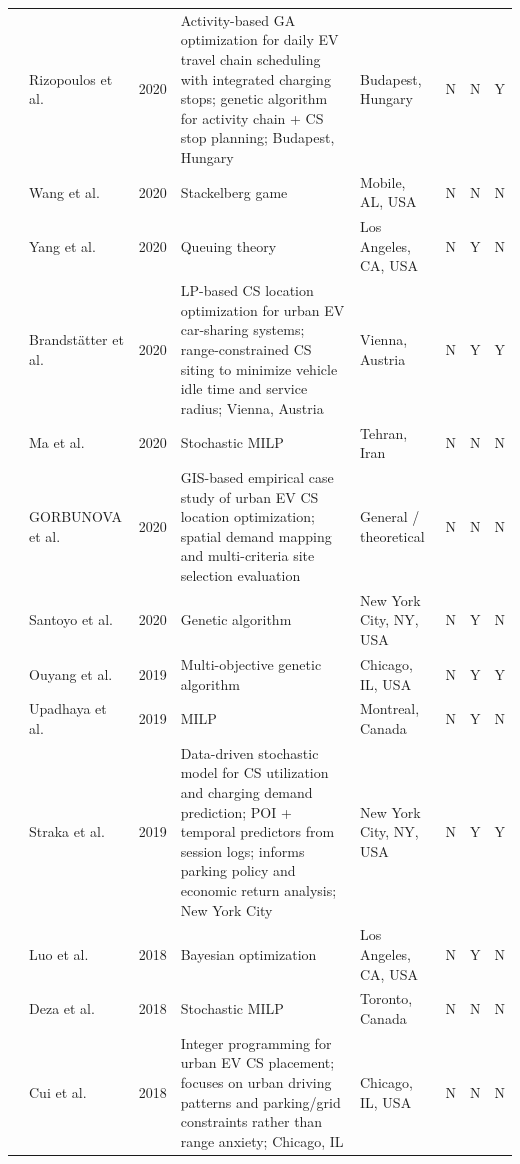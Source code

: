\documentclass[letterpaper, 12pt, oneside, doublespacing]{Thesis}
\begin{document}
\begin{longtable}{L{0.9cm} L{1.8cm} L{0.7cm} L{2.5cm} L{2.1cm} L{0.7cm} L{0.7cm} L{0.7cm}}
\cite{a_method_2020} & Rizopoulos et al. & 2020 & Activity-based GA optimization for daily EV travel chain scheduling with integrated charging stops; genetic algorithm for activity chain + CS stop planning; Budapest, Hungary & Budapest, Hungary & N & N & Y \\
\cite{double-layer_game_2020} & Wang et al. & 2020 & Stackelberg game & Mobile, AL, USA & N & N & N \\
\cite{dynamic_modeling_2020} & Yang et al. & 2020 & Queuing theory & Los Angeles, CA, USA & N & Y & N \\
\cite{location_of_2020} & Brandst\"atter et al. & 2020 & LP-based CS location optimization for urban EV car-sharing systems; range-constrained CS siting to minimize vehicle idle time and service radius; Vienna, Austria & Vienna, Austria & N & Y & Y \\
\cite{optimal_fast_2020} & Ma et al. & 2020 & Stochastic MILP & Tehran, Iran & N & N & N \\
\cite{optimizing_the_2020} & GORBUNOVA et al. & 2020 & GIS-based empirical case study of urban EV CS location optimization; spatial demand mapping and multi-criteria site selection evaluation & General {\slash} theoretical & N & N & N \\
\cite{resource_aware_2020} & Santoyo et al. & 2020 & Genetic algorithm & New York City, NY, USA & N & Y & N \\
\cite{a_method_2019} & Ouyang et al. & 2019 & Multi-objective genetic algorithm & Chicago, IL, USA & N & Y & Y \\
\cite{optimal_decision_2019} & Upadhaya et al. & 2019 & MILP & Montreal, Canada & N & Y & N \\
\cite{predicting_popularity_2019} & Straka et al. & 2019 & Data-driven stochastic model for CS utilization and charging demand prediction; POI + temporal predictors from session logs; informs parking policy and economic return analysis; New York City & New York City, NY, USA & N & Y & Y \\
\cite{a_consumer_2018} & Luo et al. & 2018 & Bayesian optimization & Los Angeles, CA, USA & N & Y & N \\
\cite{charging_station_2018} & Deza et al. & 2018 & Stochastic MILP & Toronto, Canada & N & N & N \\
\cite{electric_vehicle_2018} & Cui et al. & 2018 & Integer programming for urban EV CS placement; focuses on urban driving patterns and parking/grid constraints rather than range anxiety; Chicago, IL & Chicago, IL, USA & N & N & N \\

\end{longtable}
\end{document}
